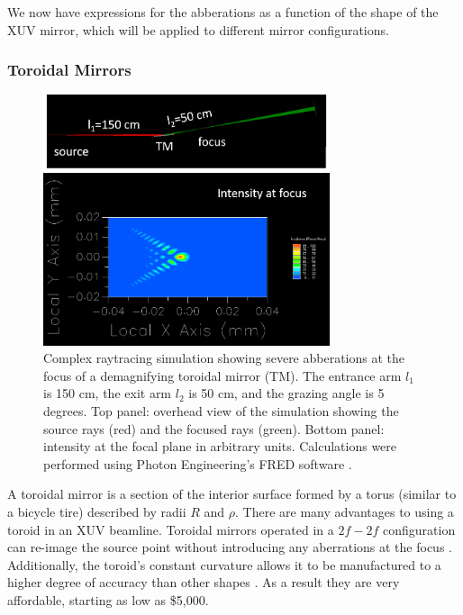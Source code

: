 We now have expressions for the abberations as a function of the shape of the XUV mirror, which will be applied to different mirror configurations.

\subsubsection{Toroidal Mirrors}

\begin{figure}
	\centering
	\includegraphics[width=0.75\textwidth]{figures/chap2/TM_coma.png}
	\caption{Complex raytracing simulation showing severe abberations at the focus of a demagnifying toroidal mirror (TM). The entrance arm $l_1$ is 150 cm, the exit arm $l_2$ is 50 cm, and the grazing angle is 5 degrees. Top panel: overhead view of the simulation showing the source rays (red) and the focused rays (green). Bottom panel: intensity at the focal plane in arbitrary units. Calculations were performed using Photon Engineering's FRED software \cite{pfistererFREDOpticalEngineering}.}
	\label{fig:TM_coma}
\end{figure}

A toroidal mirror is a section of the interior surface formed by a torus (similar to a bicycle tire) described by radii $R$ and $\rho$. There are many advantages to using a toroid in an XUV beamline. Toroidal mirrors operated in a $2f-2f$ configuration can re-image the source point without introducing any aberrations at the focus \cite{chirlaAttosecondPulseGeneration2011}. Additionally, the toroid's constant curvature allows it to be manufactured to a higher degree of accuracy than other shapes \cite{howellsMirrorsSynchrotronRadiationBeamlines1994}. As a result they are very affordable, starting as low as \$5,000.

